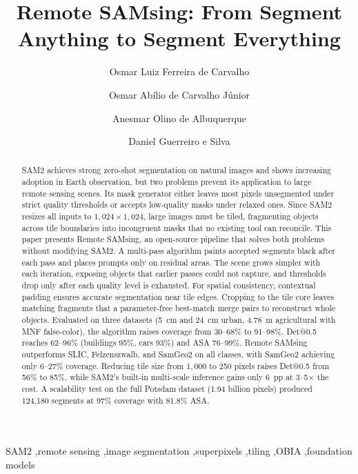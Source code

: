 \documentclass[review,11pt,authoryear]{elsarticle}
\begin{document}
\begin{frontmatter}

\title{Remote SAMsing: From Segment Anything to Segment Everything}

\author[ee]{Osmar Luiz Ferreira de Carvalho}

\author[geo]{Osmar Ab\'{i}lio de Carvalho J\'{u}nior}

\author[geo]{Anesmar Olino de Albuquerque}

\author[ee]{Daniel Guerreiro e Silva}

\address[ee]{Department of Electrical Engineering, University of Bras\'{i}lia, Bras\'{i}lia, Brazil}
\address[geo]{Department of Geography, University of Bras\'{i}lia, Bras\'{i}lia, Brazil}

\begin{abstract}
SAM2 achieves strong zero-shot segmentation on natural images and shows increasing adoption in Earth observation, but two problems prevent its application to large remote sensing scenes. Its mask generator either leaves most pixels unsegmented under strict quality thresholds or accepts low-quality masks under relaxed ones. Since SAM2 resizes all inputs to $1{,}024 \times 1{,}024$, large images must be tiled, fragmenting objects across tile boundaries into incongruent masks that no existing tool can reconcile. This paper presents Remote SAMsing, an open-source pipeline that solves both problems without modifying SAM2. A multi-pass algorithm paints accepted segments black after each pass and places prompts only on residual areas. The scene grows simpler with each iteration, exposing objects that earlier passes could not capture, and thresholds drop only after each quality level is exhausted. For spatial consistency, contextual padding ensures accurate segmentation near tile edges. Cropping to the tile core leaves matching fragments that a parameter-free best-match merge pairs to reconstruct whole objects. Evaluated on three datasets (5~cm and 24~cm urban, 4.78~m agricultural with MNF false-color), the algorithm raises coverage from 30--68\% to 91--98\%. Det@0.5 reaches 62--96\% (buildings 95\%, cars 93\%) and ASA 76--99\%. Remote SAMsing outperforms SLIC, Felzenszwalb, and SamGeo2 on all classes, with SamGeo2 achieving only 6--27\% coverage. Reducing tile size from $1{,}000$ to 250 pixels raises Det@0.5 from 56\% to 85\%, while SAM2's built-in multi-scale inference gains only 6~pp at 3--5$\times$ the cost. A scalability test on the full Potsdam dataset (1.94 billion pixels) produced 124{,}180 segments at 97\% coverage with 81.8\% ASA.
\end{abstract}

\begin{keyword}
SAM2 \sep remote sensing \sep image segmentation \sep superpixels \sep tiling \sep OBIA \sep foundation models
\end{keyword}

\end{frontmatter}
\end{document}

